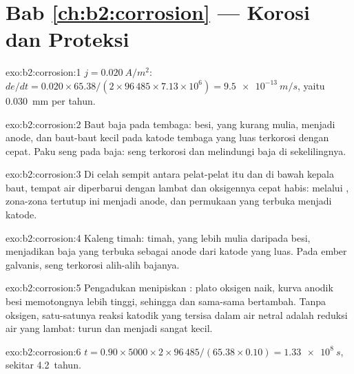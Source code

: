 \section*{Bab \ref{ch:b2:corrosion} --- Korosi dan Proteksi}

\begin{solution}{exo:b2:corrosion:1}
$j = \qty{0.020}{A/m^2}$: $de/dt = 0.020 \times 65.38/(2 \times 96\,485 \times 7.13
\times 10^6) = \qty{9.5e-13}{m/s}$, yaitu \qty{0.030}{mm} per tahun.
\end{solution}

\begin{solution}{exo:b2:corrosion:2}
Baut baja pada tembaga: besi, yang kurang mulia, menjadi anode, dan
baut-baut kecil pada katode tembaga yang luas terkorosi dengan cepat. Paku
seng pada baja: seng terkorosi dan melindungi baja di sekelilingnya.
\end{solution}

\begin{solution}{exo:b2:corrosion:3}
Di celah sempit antara pelat-pelat itu dan di bawah kepala baut, tempat air
diperbarui dengan lambat dan oksigennya cepat habis: melalui , zona-zona tertutup ini menjadi anode, dan permukaan yang
terbuka menjadi katode.
\end{solution}

\begin{solution}{exo:b2:corrosion:4}
Kaleng timah: timah, yang lebih mulia daripada besi, menjadikan baja yang
terbuka sebagai anode dari katode yang luas. Pada ember galvanis, seng
terkorosi alih-alih bajanya.
\end{solution}

\begin{solution}{exo:b2:corrosion:5}
Pengadukan menipiskan : plato oksigen naik, kurva anodik
besi memotongnya lebih tinggi, sehingga  dan 
sama-sama bertambah. Tanpa oksigen, satu-satunya reaksi katodik yang
tersisa dalam air netral adalah reduksi air yang lambat: 
turun dan  menjadi sangat kecil.
\end{solution}

\begin{solution}{exo:b2:corrosion:6}
$t = 0.90 \times 5000 \times 2 \times 96\,485/(65.38 \times 0.10) = \qty{1.33e8}{s}$,
sekitar 4.2~tahun.
\end{solution}

